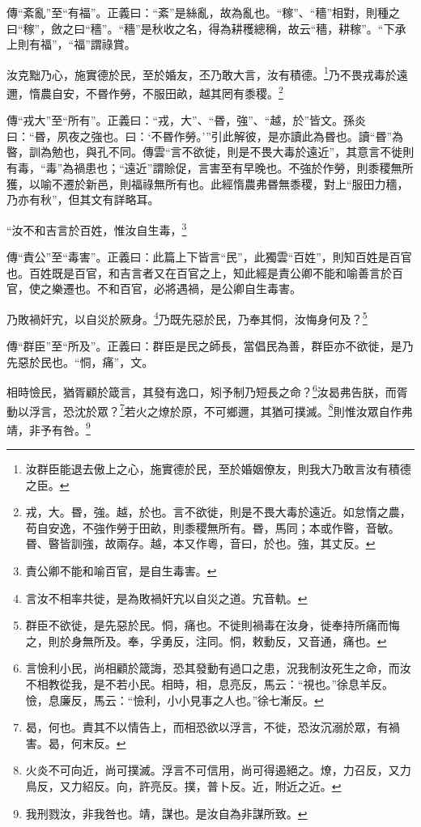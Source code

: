{\noindent\zhuan{}\fzbyks 傳“紊亂”至“有福”。正義曰：“紊”是絲亂，故為亂也。“稼”、“穡”相對，則種之曰“稼”，斂之曰“穡”。“穡”是秋收之名，得為耕穫總稱，故云“穡，耕稼”。“下承上則有福”，“福”謂祿賞。 \par}

汝克黜乃心，施實德於民，至於婚友，丕乃敢大言，汝有積德。\footnote{汝群臣能退去傲上之心，施實德於民，至於婚姻僚友，則我大乃敢言汝有積德之臣。}乃不畏戎毒於遠邇，惰農自安，不昬作勞，不服田畝，越其罔有黍稷。\footnote{戎，大。昬，強。越，於也。言不欲徙，則是不畏大毒於遠近。如怠惰之農，苟自安逸，不強作勞于田畝，則黍稷無所有。昬，馬同；本或作暋，音敏。昬、暋皆訓強，故兩存。越，本又作粵，音曰，於也。強，其丈反。}

{\noindent\zhuan{}\fzbyks 傳“戎大”至“所有”。正義曰：“戎，大”、“昬，強”、“越，於”皆文。孫炎曰：“昬，夙夜之強也。曰：‘不昬作勞。’”引此解彼，是亦讀此為昬也。讀“昬”為暋，訓為勉也，與孔不同。傳雲“言不欲徙，則是不畏大毒於遠近”，其意言不徙則有毒，“毒”為禍患也；“遠近”謂賒促，言害至有早晚也。不強於作勞，則黍稷無所獲，以喻不遷於新邑，則福祿無所有也。此經惰農弗昬無黍稷，對上“服田力穡，乃亦有秋”，但其文有詳略耳。 \par}

“汝不和吉言於百姓，惟汝自生毒，\footnote{責公卿不能和喻百官，是自生毒害。}

{\noindent\zhuan{}\fzbyks 傳“責公”至“毒害”。正義曰：此篇上下皆言“民”，此獨雲“百姓”，則知百姓是百官也。百姓既是百官，和吉言者又在百官之上，知此經是責公卿不能和喻善言於百官，使之樂遷也。不和百官，必將遇禍，是公卿自生毒害。 \par}

乃敗禍奸宄，以自災於厥身。\footnote{言汝不相率共徙，是為敗禍奸宄以自災之道。宄音軌。}乃既先惡於民，乃奉其恫，汝悔身何及？\footnote{群臣不欲徙，是先惡於民。恫，痛也。不徙則禍毒在汝身，徙奉持所痛而悔之，則於身無所及。奉，孚勇反，注同。恫，敕動反，又音通，痛也。}

{\noindent\zhuan{}\fzbyks 傳“群臣”至“所及”。正義曰：群臣是民之師長，當倡民為善，群臣亦不欲徙，是乃先惡於民也。“恫，痛”，文。 \par}

相時憸民，猶胥顧於箴言，其發有逸口，矧予制乃短長之命？\footnote{言憸利小民，尚相顧於箴誨，恐其發動有過口之患，況我制汝死生之命，而汝不相教從我，是不若小民。相時，相，息亮反，馬云：“視也。”徐息羊反。憸，息廉反，馬云：“憸利，小小見事之人也。”徐七漸反。}汝曷弗告朕，而胥動以浮言，恐沈於眾？\footnote{曷，何也。責其不以情告上，而相恐欲以浮言，不徙，恐汝沉溺於眾，有禍害。曷，何末反。}若火之燎於原，不可鄉邇，其猶可撲滅。\footnote{火炎不可向近，尚可撲滅。浮言不可信用，尚可得遏絕之。燎，力召反，又力鳥反，又力紹反。向，許亮反。撲，普卜反。近，附近之近。}則惟汝眾自作弗靖，非予有咎。\footnote{我刑戮汝，非我咎也。靖，謀也。是汝自為非謀所致。}

